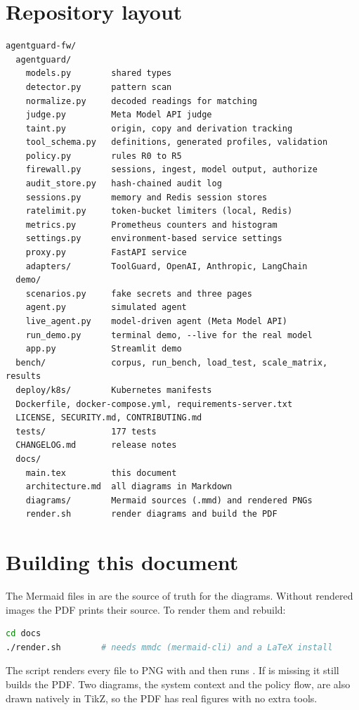 \documentclass[11pt,a4paper]{article}
\newcommand{\code}[1]{\texttt{\detokenize{#1}}}
\newcounter{diagram}
\begin{document}
\section{Repository layout}
\begin{lstlisting}
agentguard-fw/
  agentguard/
    models.py        shared types
    detector.py      pattern scan
    normalize.py     decoded readings for matching
    judge.py         Meta Model API judge
    taint.py         origin, copy and derivation tracking
    tool_schema.py   definitions, generated profiles, validation
    policy.py        rules R0 to R5
    firewall.py      sessions, ingest, model output, authorize
    audit_store.py   hash-chained audit log
    sessions.py      memory and Redis session stores
    ratelimit.py     token-bucket limiters (local, Redis)
    metrics.py       Prometheus counters and histogram
    settings.py      environment-based service settings
    proxy.py         FastAPI service
    adapters/        ToolGuard, OpenAI, Anthropic, LangChain
  demo/
    scenarios.py     fake secrets and three pages
    agent.py         simulated agent
    live_agent.py    model-driven agent (Meta Model API)
    run_demo.py      terminal demo, --live for the real model
    app.py           Streamlit demo
  bench/             corpus, run_bench, load_test, scale_matrix, results
  deploy/k8s/        Kubernetes manifests
  Dockerfile, docker-compose.yml, requirements-server.txt
  LICENSE, SECURITY.md, CONTRIBUTING.md
  tests/             177 tests
  CHANGELOG.md       release notes
  docs/
    main.tex         this document
    architecture.md  all diagrams in Markdown
    diagrams/        Mermaid sources (.mmd) and rendered PNGs
    render.sh        render diagrams and build the PDF
\end{lstlisting}

\section{Building this document}
The Mermaid files in \code{docs/diagrams} are the source of truth for the diagrams. Without rendered images the PDF prints their source. To render them and rebuild:
\begin{lstlisting}[language=bash]
cd docs
./render.sh        # needs mmdc (mermaid-cli) and a LaTeX install
\end{lstlisting}
The script renders every \code{.mmd} file to PNG with \code{mmdc} and then runs \code{latexmk}. If \code{mmdc} is missing it still builds the PDF. Two diagrams, the system context and the policy flow, are also drawn natively in TikZ, so the PDF has real figures with no extra tools.
\end{document}
